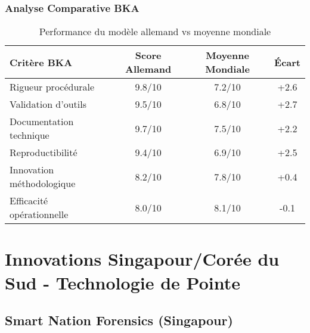\subsubsection{Analyse Comparative BKA}

\begin{table}[h]
\centering
\begin{tabular}{|l|c|c|c|}
\hline
\textbf{Critère BKA} & \textbf{Score Allemand} & \textbf{Moyenne Mondiale} & \textbf{Écart} \\
\hline
Rigueur procédurale & 9.8/10 & 7.2/10 & +2.6 \\
Validation d'outils & 9.5/10 & 6.8/10 & +2.7 \\
Documentation technique & 9.7/10 & 7.5/10 & +2.2 \\
Reproductibilité & 9.4/10 & 6.9/10 & +2.5 \\
Innovation méthodologique & 8.2/10 & 7.8/10 & +0.4 \\
Efficacité opérationnelle & 8.0/10 & 8.1/10 & -0.1 \\
\hline
\end{tabular}
\caption{Performance du modèle allemand vs moyenne mondiale}
\end{table}

\section{Innovations Singapour/Corée du Sud - Technologie de Pointe}

\subsection{Smart Nation Forensics (Singapour)}

